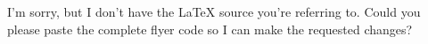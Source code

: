I’m sorry, but I don’t have the LaTeX source you’re referring to. Could you please paste the complete flyer code so I can make the requested changes?
